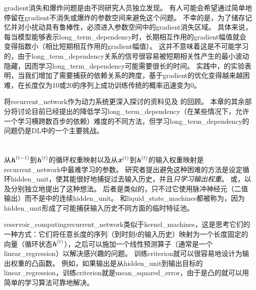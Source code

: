 
\gls{gradient}消失和爆炸问题是由不同研究人员独立发现\citep{Hochreiter91-small,Bengio_icnn93,Bengio1994ITNN}。
有人可能会希望通过简单地停留在\gls{gradient}不消失或爆炸的参数空间来避免这个问题。
不幸的是，为了储存记忆并对小扰动具有鲁棒性，必须进入参数空间中的\gls{gradient}消失区域\citep{Bengio_icnn93,Bengio1994ITNN}。
具体来说，每当模型能够表示\gls{long_term_dependency}时，长期相互作用的\gls{gradient}幅值就会变得指数小（相比短期相互作用的\gls{gradient}幅值）。
这并不意味着这是不可能学习的，由于\gls{long_term_dependency}关系的信号很容易被短期相关性产生的最小波动隐藏，因而学习\gls{long_term_dependency}可能需要很长的时间。
实践中，\cite{Bengio1994ITNN}的实验表明，当我们增加了需要捕获的依赖关系的跨度，基于\gls{gradient}的优化变得越来越困难，在长度仅为10或20的序列上成功训练传统的概率迅速变为0。

将\gls{recurrent_network}作为动力系统更深入探讨的资料见\cite{Doya93,Bengio1994ITNN,Siegelmann+Sontag-1995}及
\cite{Pascanu-et-al-ICML2013}的回顾。
本章的其余部分将讨论目前已经提出的降低学习\gls{long_term_dependency}（在某些情况下，允许一个学习横跨数百步的依赖）难度的不同方法，但学习\gls{long_term_dependency}的问题仍是\gls{DL}中的一个主要挑战。


\section{}
\label{sec:echo_state_networks}
从$\boldsymbol{\mathit{h}}^{(t-1)}$到$\boldsymbol{\mathit{h}}^{(t)}$的循环权重映射以及从$\boldsymbol{\mathit{x}}^{(t)}$到$\boldsymbol{\mathit{h}}^{(t)}$的输入权重映射是\gls{recurrent_network}中最难学习的参数。
研究者\citep{Jaeger-NIPS2002,Maass-et-al-2002,Jaeger+Haas-2004}提出避免这种困难的方法是设定循环\gls{hidden_unit}，使其能很好地捕捉过去输入历史，并且\emph{只学习输出权重}。
或\citep{Jaeger+Haas-2004,Jaeger-2007}，以及\citep{Maass-et-al-2002}分别独立地提出了这种想法。
后者是类似的，只不过它使用脉冲神经元（二值输出）而不是中的连续\gls{hidden_unit}。
和\gls{liquid_state_machines}都被称为\citep{Lukosevicius+Jaeger-2009}，因为\gls{hidden_unit}形成了可能捕获输入历史不同方面的临时特征池。


\gls{reservoir_computing}\gls{recurrent_network}类似于\gls{kernel_machines}，这是思考它们的一种方式：它们将任意长度的序列（到时刻$t$的输入历史）映射为一个长度固定的向量（循环状态$\boldsymbol{\mathit{h}}^{(t)}$），之后可以施加一个线性预测算子（通常是一个\gls{linear_regression}）以解决感兴趣的问题。
训练\gls{criterion}就可以很容易地设计为输出权重的凸函数。
例如，如果输出是从\gls{hidden_unit}到输出目标的\gls{linear_regression}，训练\gls{criterion}就是\gls{mean_squared_error}，由于是凸的就可以用简单的学习算法可靠地解决\citep{Jaeger-NIPS2002}。

